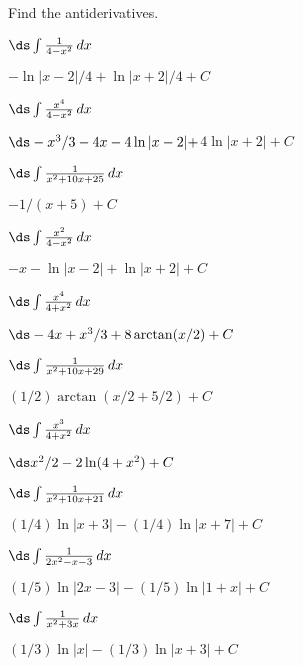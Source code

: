 \begin{exercises}

Find the antiderivatives.
\twocol

\begin{exercise} $\ds\int {1\over 4-x^2}\,dx$
\begin{answer} $-\ln|x-2|/4+\ln|x+2|/4+C$
\end{answer}\end{exercise}

\begin{exercise} $\ds\int {x^4\over 4-x^2}\,dx$
\begin{answer} $\ds -x^3/3-4x-4\ln|x-2|+$\hfill\break$4\ln|x+2| +C$
\end{answer}\end{exercise}

\begin{exercise} $\ds\int {1\over x^2+10x+25}\,dx$
\begin{answer} $-1/(x+5) +C$
\end{answer}\end{exercise}

\begin{exercise} $\ds\int {x^2\over 4-x^2}\,dx$
\begin{answer} $-x-\ln|x-2|+\ln|x+2| +C$
\end{answer}\end{exercise}

\begin{exercise} $\ds\int {x^4\over 4+x^2}\,dx$
\begin{answer} $\ds -4x+x^3/3+8\arctan(x/2) +C$
\end{answer}\end{exercise}

\begin{exercise} $\ds\int {1\over x^2+10x+29}\,dx$
\begin{answer} $(1/2)\arctan(x/2+5/2) +C$
\end{answer}\end{exercise}

\begin{exercise} $\ds\int {x^3\over 4+x^2}\,dx$
\begin{answer} $\ds x^2/2-2\ln(4+x^2) +C$
\end{answer}\end{exercise}

\begin{exercise} $\ds\int {1\over x^2+10x+21}\,dx$
\begin{answer} $(1/4)\ln|x+3|-(1/4)\ln|x+7| +C$
\end{answer}\end{exercise}

\begin{exercise} $\ds\int {1\over 2x^2-x-3}\,dx$
\begin{answer} $(1/5)\ln|2x-3|-(1/5)\ln|1+x| +C$
\end{answer}\end{exercise}

\begin{exercise} $\ds\int {1\over x^2+3x}\,dx$
\begin{answer} $(1/3)\ln|x|-(1/3)\ln|x+3| +C$
\end{answer}\end{exercise}

\endtwocol

\end{exercises}
